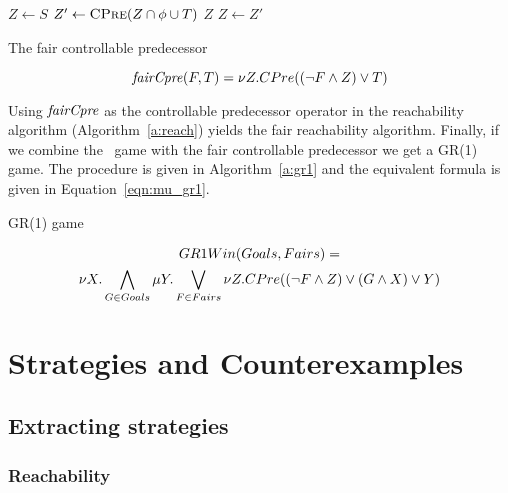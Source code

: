 \begin{algorithm}[t]
\begin{algorithmic}
\State $Z \gets S$
\Loop
\State $Z' \gets \Call{CPre}{Z \cap \phi \cup T}$
\State\Return $Z$\EndIf
\State $Z \gets Z'$
\EndLoop
\EndFunction
\end{algorithmic}
\caption{The fair controllable predecessor}
\label{a:fair_cpre}
\end{algorithm}

\begin{equation}
    \mathit{fairCpre}(F, T) = \nu Z. CPre((\neg F \wedge Z) \vee T)
\label{eqn:mu_fair}
\end{equation}

Using $\mathit{fairCpre}$ as the controllable predecessor operator in the reachability algorithm (Algorithm~\ref{a:reach}) yields the fair reachability algorithm. Finally, if we combine the \buchi\ game with the fair controllable predecessor we get a GR(1) game. The procedure is given in Algorithm~\ref{a:gr1} and the equivalent \mucalc formula is given in Equation~\ref{eqn:mu_gr1}.

\begin{algorithm}[t]
\begin{algorithmic}
\State\Return {}
\EndFunction
\end{algorithmic}
\caption{GR(1) game}
\label{a:gr1}
\end{algorithm}

\begin{multline}
    GR1Win(Goals, Fairs) = \\ \nu X. \bigwedge_{G \in Goals} \mu Y. \bigvee_{F \in Fairs} \nu Z. CPre((\neg F \wedge Z) \vee (G \wedge X) \vee Y)
\label{eqn:mu_gr1}
\end{multline}

\section{Strategies and Counterexamples}

\subsection{Extracting strategies}

\subsubsection{Reachability}

